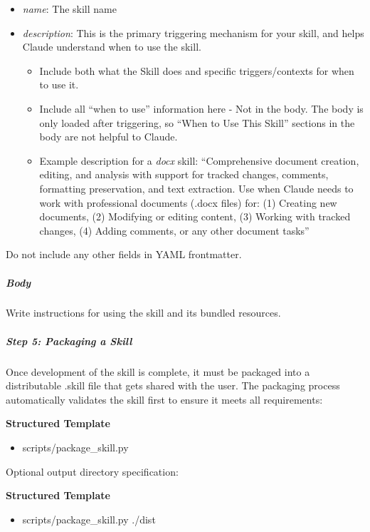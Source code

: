 \documentclass[11pt]{article}
\begin{document}
\begin{itemize}[leftmargin=*,itemsep=2pt,topsep=2pt]
\item {} \emph{name}: The skill name
\item {} \emph{description}: This is the primary triggering mechanism for your skill, and helps Claude understand when to use the skill.
\begin{itemize}[leftmargin=*,itemsep=2pt,topsep=2pt]
\item {} Include both what the Skill does and specific triggers/contexts for when to use it.
\item {} Include all ``when to use'' information here - Not in the body. The body is only loaded after triggering, so ``When to Use This Skill'' sections in the body are not helpful to Claude.
\item {} Example description for a \emph{docx} skill: ``Comprehensive document creation, editing, and analysis with support for tracked changes, comments, formatting preservation, and text extraction. Use when Claude needs to work with professional documents (.docx files) for: (1) Creating new documents, (2) Modifying or editing content, (3) Working with tracked changes, (4) Adding comments, or any other document tasks''
\end{itemize}
\end{itemize}

Do not include any other fields in YAML frontmatter.


\subparagraph{Body}\mbox{}\par

Write instructions for using the skill and its bundled resources.


\subparagraph{Step 5: Packaging a Skill}\mbox{}\par

Once development of the skill is complete, it must be packaged into a distributable .skill file that gets shared with the user. The packaging process automatically validates the skill first to ensure it meets all requirements:


\textbf{Structured Template}
\begin{itemize}[leftmargin=*,itemsep=2pt,topsep=2pt]
\item {} scripts/package\_\allowbreak{}skill.py
\end{itemize}

Optional output directory specification:


\textbf{Structured Template}
\begin{itemize}[leftmargin=*,itemsep=2pt,topsep=2pt]
\item {} scripts/package\_\allowbreak{}skill.py ./dist
\end{itemize}
\end{document}
